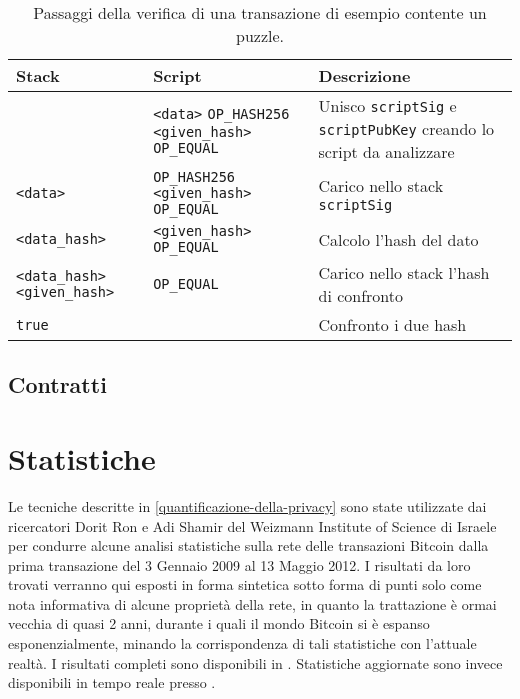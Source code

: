 \begin{table}
  \centering
  \label{table:puzzle-transaction}
  \begin{tabular}{m{} | m{} | m{}}
    \hline
    Stack&Script&Descrizione \\
    \hline
    \verb||&\verb|<data>| \verb|OP_HASH256| \verb|<given_hash>| \verb|OP_EQUAL|&Unisco \verb|scriptSig| e \verb|scriptPubKey| creando lo script da analizzare  \\ \hline
    \verb|<data>|&\verb|OP_HASH256| \verb|<given_hash>| \verb|OP_EQUAL|&Carico nello stack \verb|scriptSig| \\ \hline
    \verb|<data_hash>|&\verb|<given_hash>| \verb|OP_EQUAL|&Calcolo l'hash del dato \\ \hline
    \verb|<data_hash>| \verb|<given_hash>|&\verb|OP_EQUAL|&Carico nello stack l'hash di confronto \\ \hline
    \verb|true|&\verb||&Confronto i due hash \\ \hline
  \end{tabular}
  \caption{Passaggi della verifica di una transazione di esempio contente un puzzle.}
\end{table}

\subsection{Contratti}\label{contratti}

\section{Statistiche}

Le tecniche descritte in \ref{quantificazione-della-privacy} sono state utilizzate dai ricercatori Dorit Ron e Adi Shamir del Weizmann Institute of Science di Israele per condurre alcune analisi statistiche sulla rete delle transazioni Bitcoin dalla prima transazione del 3 Gennaio 2009 al 13 Maggio 2012. I risultati da loro trovati verranno qui esposti in forma sintetica sotto forma di punti solo come nota informativa di alcune proprietà della rete, in quanto la trattazione è ormai vecchia di quasi 2 anni, durante i quali il mondo Bitcoin si è espanso esponenzialmente, minando la corrispondenza di tali statistiche con l'attuale realtà. I risultati completi sono disponibili in \cite{transazioni}. Statistiche aggiornate sono invece disponibili in tempo reale presso \cite{blockchain-info}.\\

